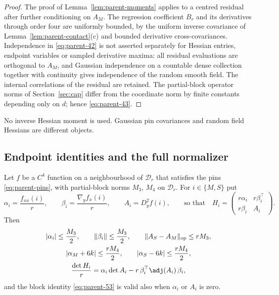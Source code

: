 \begin{proof}
The proof of Lemma~\ref{lem:parent-moments} applies to a centred residual after further conditioning on $A_M$. The regression coefficient $B_r$ and its derivatives through order four are uniformly bounded, by the uniform inverse covariance of Lemma~\ref{lem:parent-contact}(c) and bounded derivative cross-covariances. Independence in \eqref{eq:parent-42} is not asserted separately for Hessian entries, endpoint variables or sampled derivative maxima: all residual evaluations are orthogonal to $A_M$, and Gaussian independence on a countable dense collection together with continuity gives independence of the random smooth field. The internal correlations of the residual are retained. The partial-block operator norms of Section~\ref{sec:cap} differ from the coordinate norm by finite constants depending only on $d$; hence \eqref{eq:parent-43}.
\end{proof}

No inverse Hessian moment is used. Gaussian pin covariances and random field Hessians are different objects.

\subsection{Endpoint identities and the full normalizer}\label{ssec:parent-normalizer}

\begin{lemma}\label{lem:parent-endpoint}
Let $f$ be a $C^4$ function on a neighbourhood of $\mathcal D_r$ that satisfies the pins \eqref{eq:parent-pins}, with partial-block norms $M_3$, $M_4$ on $\mathcal D_r$. For $i\in\{M,S\}$ put
\[
\alpha_i=\frac{f_{xx}(i)}r,\qquad \beta_i=\frac{\nabla_yf_x(i)}r,\qquad A_i=D_y^2f(i),\qquad\text{so that}\quad H_i=\begin{pmatrix}r\alpha_i&r\beta_i^{\top}\\ r\beta_i&A_i\end{pmatrix}.
\]
Then
\begin{gather}
|\alpha_i|\le\frac{M_3}2,\qquad \|\beta_i\|\le\frac{M_3}2,\qquad \|A_S-A_M\|_{\rm op}\le rM_3,\label{eq:parent-51}\\
|\alpha_M+6k|\le\frac{rM_4}2,\qquad |\alpha_S-6k|\le\frac{rM_4}2,\label{eq:parent-52}\\
\frac{\det H_i}r=\alpha_i\det A_i-r\,\beta_i^{\top}\adj(A_i)\,\beta_i ,\label{eq:parent-53}
\end{gather}
and the block identity \eqref{eq:parent-53} is valid also when $\alpha_i$ or $A_i$ is zero.
\end{lemma}

